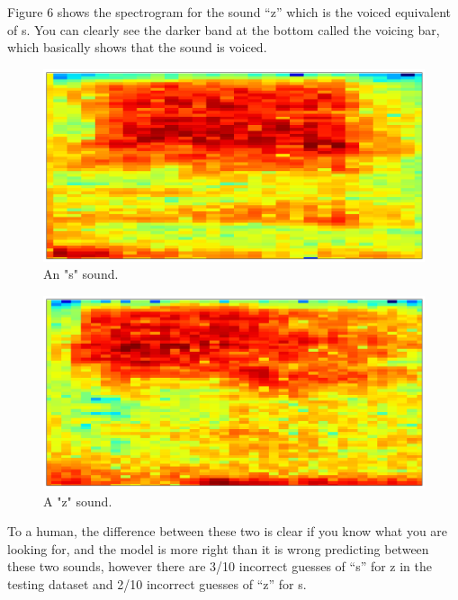 \documentclass[10pt,twocolumn]{article}
\begin{document}
Figure 6 shows the spectrogram for the sound “z” which is the voiced equivalent of s. You can clearly see the darker band at the bottom called the voicing bar, which basically shows that the sound is voiced. 


\begin{figure}
    \centering
    \includegraphics[width=.95\linewidth]{s_sound.png}
    \caption{
        An "s" sound.
    }
    \label{fig:first-page}
\end{figure}

\begin{figure}
    \centering
    \includegraphics[width=.95\linewidth]{z_sound.png}
    \caption{
        A "z" sound.
    }
    \label{fig:first-page}
\end{figure}


To a human, the difference between these two is clear if you know what you are looking for, and the model is more right than it is wrong predicting between these two sounds, however there are 3/10 incorrect guesses of “s” for z in the testing dataset and 2/10 incorrect guesses of “z” for s.
\end{document}
